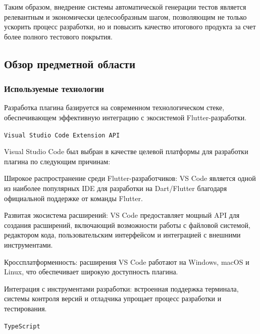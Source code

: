\documentclass[14pt, russian]{scrartcl}
\begin{document}
Таким образом, внедрение системы автоматической генерации тестов является релевантным и экономически целесообразным шагом, позволяющим не только ускорить процесс разработки, но и повысить качество итогового продукта за счет более полного тестового покрытия.

\subsection{Обзор предметной области}

\subsubsection{Используемые технологии}

Разработка плагина базируется на современном технологическом стеке, обеспечивающем эффективную интеграцию с экосистемой Flutter-разработки.

\texttt{Visual Studio Code Extension API}

Visual Studio Code был выбран в качестве целевой платформы для разработки плагина по следующим причинам:
\begin{itemize*}
    \item Широкое распространение среди Flutter-разработчиков: VS Code является одной из наиболее популярных IDE для разработки на Dart/Flutter благодаря официальной поддержке от команды Flutter.
    \item Развитая экосистема расширений: VS Code предоставляет мощный API для создания расширений, включающий возможности работы с файловой системой, редактором кода, пользовательским интерфейсом и интеграцией с внешними инструментами.
    \item Кроссплатформенность: расширения VS Code работают на Windows, macOS и Linux, что обеспечивает широкую доступность плагина.
    \item Интеграция с инструментами разработки: встроенная поддержка терминала, системы контроля версий и отладчика упрощает процесс разработки и тестирования.
\end{itemize*}

\texttt{TypeScript}
\end{document}
